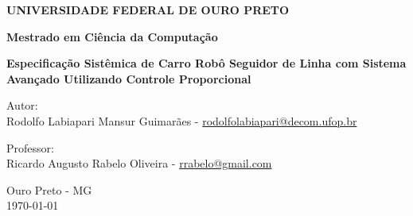 \documentclass[portugues, brazil, a4paper,12pt]{article}
\begin{document}
\begin{titlepage}
  \vfill

  \begin{center}
    \begin{Large}
      \textbf{UNIVERSIDADE FEDERAL DE OURO PRETO}
    \end{Large}
  \end{center}

  \begin{center}
    \begin{large}
      \textbf{Mestrado em Ciência da Computação} \\[1.4cm] 
    \end{large}
  \end{center}

  \vfill

  \begin{center}
    \begin{large}
      \textbf{Especificação Sistêmica de Carro Robô Seguidor de Linha com Sistema Avançado Utilizando Controle Proporcional}
    \end{large}
  \end{center}

  \vfill

  \begin{center}
    \begin{large}
      Autor: \\
		Rodolfo Labiapari Mansur Guimarães - \url{rodolfolabiapari@decom.ufop.br}
    \end{large}
  \end{center}

	\vfill

  \begin{center}
    \begin{large}
      Professor: \\
      Ricardo Augusto Rabelo Oliveira - \url{rrabelo@gmail.com}
    \end{large}
  \end{center}

  \vfill

  \begin{center}
    \begin{large}
      Ouro Preto - MG \\
      \today \\
    \end{large}
  \end{center}

\clearpage
\tableofcontents 
\end{titlepage}
\end{document}
